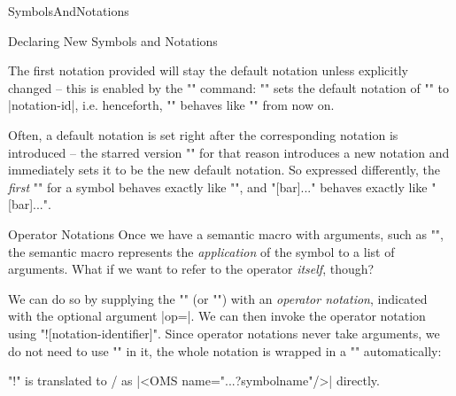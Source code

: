 \begin{smodule}[ns=https://github.com/slatex/sTeX/doc]{SymbolsAndNotations}
\begin{sfragment}{Declaring New Symbols and Notations}
    \begin{function}{\setnotation}
        The first notation provided will stay the default notation
        unless explicitly changed -- this is enabled by the 
        \stexcode"\setnotation" command:
        \stexcode"" sets the
        default notation of \stexcode"\symbolname" to |notation-id|,
        i.e. henceforth, \stexcode"\symbolname" behaves like
        \stexcode"\symbolname[notation-id]" from now on.
    \end{function}

    Often, a default notation is set right after the corresponding
    notation is introduced -- the starred version \stexcode"\notation*"
    for that reason introduces a new notation and immediately sets it
    to be the new default notation. So expressed differently,
    the \emph{first} \stexcode"\notation" for a symbol behaves
    exactly like \stexcode"\notation*", and 
    \stexcode"[bar]{...}" behaves exactly like
    \stexcode"[bar]{...}".
    
    \begin{sfragment}{Operator Notations}
        Once we have a semantic macro with arguments, such as
        \stexcode"\newbinarysymbol", the semantic macro
        represents the \emph{application} of the symbol
        to a list of arguments. What if we want to
        refer to the operator \emph{itself}, though?

        We can do so by supplying the \stexcode"\notation" (or
        \stexcode"\symdef") with an \emph{operator notation},
        indicated with the optional argument |op=|.
        We can then invoke the operator notation using
        \stexcode"\symbolname![notation-identifier]".
        Since operator notations never take arguments, we do not
        need to use \stexcode"\comp" in it, the whole notation is
        wrapped in a \stexcode"\comp" automatically:

        \begin{mmtbox}
            \stexcode"\symbolname!" is translated to \omdoc/\mmt
            as |<OMS name="...?symbolname"/>| directly.
        \end{mmtbox}

    \end{sfragment}
\end{sfragment}


\end{smodule}
